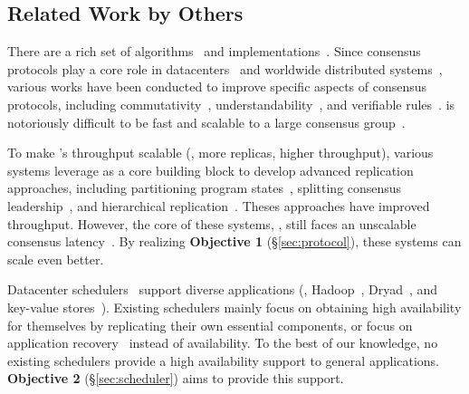 \vspace{-.15in}\subsection{Related Work by Others} 
\label{sec:others-work}\vspace{-.075in}

There are a rich set of \paxos 
algorithms~\cite{paxos:practical,paxos,paxos:simple,paxos:complex,
epaxos:sosp13} 
and implementations~\cite{paxos:live,paxos:practical,chubby:osdi,crane:sosp15}. 
Since consensus protocols play a core role in 
datacenters~\cite{matei:hotcloud11, mesos:nsdi11, 
datacenter:os} and worldwide 
distributed systems~\cite{spanner:osdi12,mencius:osdi08}, various works 
have been conducted to improve specific aspects of consensus protocols, 
including commutativity~\cite{epaxos:sosp13}, 
understandability~\cite{raft:usenix14,paxos}, and verifiable 
rules~\cite{modist:nsdi09,demeter:sosp11}. \paxos is notoriously difficult to be 
fast and scalable to a large consensus 
group~\cite{ellis:thesis,manos:hotdep10,scatter:sosp11}. 

To make \paxos's throughput scalable (\ie, more replicas, higher throughput), 
various systems leverage \paxos as a core building block to develop advanced 
replication approaches, including partitioning program 
states~\cite{scatter:sosp11,ssmr:dsn14}, splitting consensus 
leadership~\cite{mencius:osdi08,spaxos:srds12}, and hierarchical 
replication~\cite{manos:hotdep10,scatter:sosp11}. Theses approaches have 
improved throughput. However, the core of these systems, 
\paxos, still faces an unscalable consensus 
latency~\cite{ellis:thesis,scatter:sosp11,manos:hotdep10}. By realizing 
\textbf{Objective 1} (\S\ref{sec:protocol}), these systems can scale even 
better.

 Datacenter
schedulers~\cite{borg:eurosys15,mesos:nsdi11,tupperware,yarn:socc13,
autopilot:sosp07,quincy:sosp09,apollo:osdi14,fuxi:vldb14} support diverse 
applications (\eg, Hadoop~\cite{hadoop}, Dryad~\cite{dryad}, and key-value 
stores~\cite{redis}). Existing schedulers mainly focus on obtaining high 
availability for themselves by replicating their own essential components, or 
focus on application recovery~\cite{fuxi:vldb14} instead of availability. 
To the best of our knowledge, no existing schedulers provide a
high availability support to general applications. \textbf{Objective 2} 
(\S\ref{sec:scheduler}) aims to provide this support.

